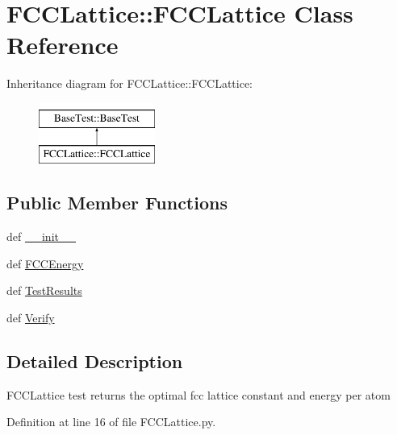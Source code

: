 \hypertarget{classFCCLattice_1_1FCCLattice}{
\section{FCCLattice::FCCLattice Class Reference}
\label{classFCCLattice_1_1FCCLattice}
}
Inheritance diagram for FCCLattice::FCCLattice:\begin{figure}[H]
\begin{center}
\leavevmode
\includegraphics[height=2.000000cm]{classFCCLattice_1_1FCCLattice}
\end{center}
\end{figure}
\subsection*{Public Member Functions}
\begin{DoxyCompactItemize}
\item 
def \hyperlink{classFCCLattice_1_1FCCLattice_a80676c6dd31cab664be82fbdfead9576}{\_\-\_\-init\_\-\_\-}
\item 
def \hyperlink{classFCCLattice_1_1FCCLattice_a77866f6c592f0c8197833dcfd22e5145}{FCCEnergy}
\item 
def \hyperlink{classFCCLattice_1_1FCCLattice_a609b2ffb13217a24e05f12b1903eaaec}{TestResults}
\item 
def \hyperlink{classFCCLattice_1_1FCCLattice_aabdfdef0bb7ac45194ba57a22dff7ff8}{Verify}
\end{DoxyCompactItemize}


\subsection{Detailed Description}
\begin{DoxyVerb}FCCLattice test returns the optimal fcc lattice constant and energy per atom\end{DoxyVerb}
 

Definition at line 16 of file FCCLattice.py.



